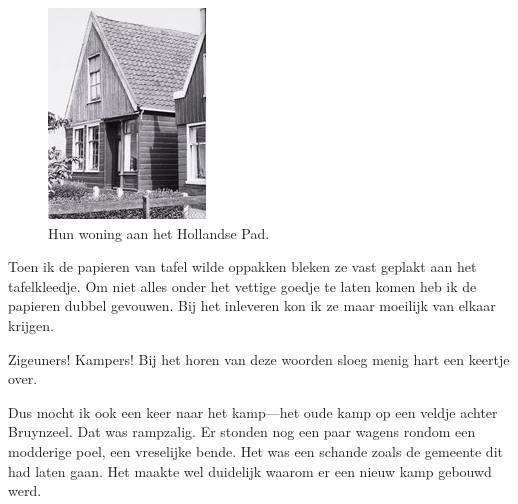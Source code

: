\documentclass[10pt,twoside, openright]{memoir}
\begin{document}
\begin{figure}
\includegraphics[width=\textwidth]{img/ch42/image}
\caption*{\footnotesize Hun woning aan het Hollandse Pad.}
\end{figure}

Toen ik de papieren van tafel wilde oppakken bleken ze vast geplakt aan het tafelkleedje. Om niet alles onder het vettige goedje te laten komen heb ik de papieren dubbel gevouwen. Bij het inleveren kon ik ze maar moeilijk van elkaar krijgen.	

Zigeuners! Kampers! Bij het horen van deze woorden sloeg menig hart een keertje over. 

Dus mocht ik ook een keer naar het kamp---het oude kamp op een veldje achter Bruynzeel. Dat was rampzalig. Er stonden nog een paar wagens rondom een modderige poel, een vreselijke bende. Het was een schande zoals de gemeente dit had laten gaan. Het maakte wel duidelijk waarom er een nieuw kamp gebouwd werd. 
\end{document}
